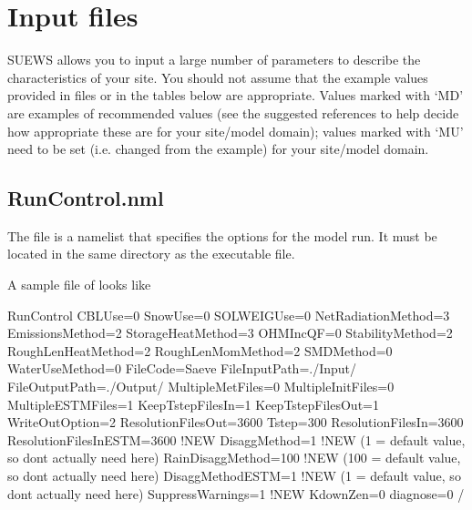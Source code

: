 \documentclass[letterpaper,10pt,english]{sphinxmanual}
\begin{document}
\chapter{Input files}
\label{\detokenize{input_files/input_files::doc}}\label{\detokenize{input_files/input_files:input-files}}\label{\detokenize{input_files/input_files:id1}}
SUEWS allows you to input a large number of parameters to describe the
characteristics of your site. You should not assume that the example
values provided in files or in the tables below are appropriate. Values
marked with ‘MD’ are examples of recommended values (see the suggested
references to help decide how appropriate these are for your site/model
domain); values marked with ‘MU’ need to be set (i.e. changed from the
example) for your site/model domain.
\label{\detokenize{input_files/RunControl/RunControl:runcontrol}}

\section{RunControl.nml}
\label{\detokenize{input_files/RunControl/RunControl:runcontrol}}\label{\detokenize{input_files/RunControl/RunControl:runcontrol-nml}}\label{\detokenize{input_files/RunControl/RunControl::doc}}\label{\detokenize{input_files/RunControl/RunControl:id1}}
The file  is a namelist that specifies the options for
the model run. It must be located in the same directory as the
executable file.

A sample file of  looks like

%
\begin{sphinxVerbatim}[commandchars=\\\{\}]
\PYGZam{}RunControl
CBLUse=0
SnowUse=0
SOLWEIGUse=0
NetRadiationMethod=3 
EmissionsMethod=2
StorageHeatMethod=3
OHMIncQF=0
StabilityMethod=2
RoughLenHeatMethod=2
RoughLenMomMethod=2
SMDMethod=0
WaterUseMethod=0
FileCode=\PYGZsq{}Saeve\PYGZsq{}
FileInputPath=\PYGZdq{}./Input/\PYGZdq{}
FileOutputPath=\PYGZdq{}./Output/\PYGZdq{}
MultipleMetFiles=0
MultipleInitFiles=0
MultipleESTMFiles=1
KeepTstepFilesIn=1
KeepTstepFilesOut=1
WriteOutOption=2
ResolutionFilesOut=3600
Tstep=300
ResolutionFilesIn=3600
ResolutionFilesInESTM=3600  !NEW
DisaggMethod=1          !NEW  (1 = default value, so don\PYGZsq{}t actually need here)
RainDisaggMethod=100    !NEW  (100 = default value, so don\PYGZsq{}t actually need here)
DisaggMethodESTM=1      !NEW  (1 = default value, so don\PYGZsq{}t actually need here)
SuppressWarnings=1      !NEW
KdownZen=0
diagnose=0
/
\end{sphinxVerbatim}
\end{document}
